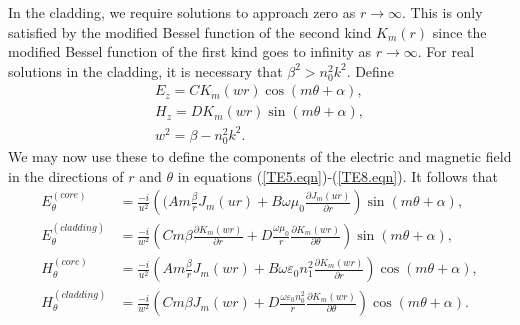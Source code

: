 \documentclass[12pt]{article}
\theoremstyle{definition}
\numberwithin{equation}{section}
\begin{document}
{In the cladding, we require solutions to approach zero as $r\rightarrow\infty$. This is only satisfied by the modified Bessel function of the second kind $K_m(r)$ since the modified Bessel function of the first kind goes to infinity as $r\rightarrow\infty$. For real solutions in the cladding, it is necessary that $\beta^2>n_0^2k^2$.
Define
\begin{equation}
\begin{array}{c}
E_z=CK_m(wr)\cos{(m\theta+\alpha)},\\
H_z=DK_m(wr)\sin{(m\theta+\alpha)},\\
w^2=\beta-n_0^2k^2.
\end{array}\label{cutoff.eqn}
\end{equation}
We may now use these to define the components of the electric and magnetic field in the directions of $r$ and $\theta$ in equations (\ref{TE5.eqn})-(\ref{TE8.eqn}). It follows that
\begin{align*}
E_\theta^{(core)}&=\frac{-i}{u^2}\left((Am\frac{\beta}{r}J_m(ur)+B\omega\mu_0\frac{\partial J_m(ur)}{\partial r}\right)\sin{(m\theta+\alpha)},\\
E_\theta^{(cladding)}&=\frac{-i}{w^2}\left(Cm\beta\frac{\partial K_m(wr)}{\partial r}+D\frac{\omega\mu_0}{r}\frac{\partial K_m(wr)}{\partial\theta}\right)\sin{(m\theta+\alpha)},\\
H_\theta^{(core)}&=\frac{-i}{u^2}\left(Am\frac{\beta}{r}J_m(wr)+B\omega\varepsilon_0 n_1^2\frac{\partial K_m(wr)}{\partial r}\right)\cos{(m\theta+\alpha)},\\
H_\theta^{(cladding)}&=\frac{-i}{w^2}\left(Cm\beta J_m(wr)+D\frac{\omega\varepsilon_0 n_0^2}{r}\frac{\partial K_m(wr)}{\partial\theta}\right)\cos{(m\theta+\alpha)}.
\end{align*}

}
\end{document}
